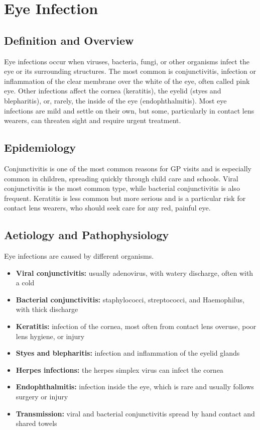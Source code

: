 \chapter{Eye Infection}

\section*{Definition and Overview}
Eye infections occur when viruses, bacteria, fungi, or other organisms infect the eye or its surrounding structures. The most common is conjunctivitis, infection or inflammation of the clear membrane over the white of the eye, often called pink eye. Other infections affect the cornea (keratitis), the eyelid (styes and blepharitis), or, rarely, the inside of the eye (endophthalmitis). Most eye infections are mild and settle on their own, but some, particularly in contact lens wearers, can threaten sight and require urgent treatment.

\section*{Epidemiology}
Conjunctivitis is one of the most common reasons for GP visits and is especially common in children, spreading quickly through child care and schools. Viral conjunctivitis is the most common type, while bacterial conjunctivitis is also frequent. Keratitis is less common but more serious and is a particular risk for contact lens wearers, who should seek care for any red, painful eye.

\section*{Aetiology and Pathophysiology}
Eye infections are caused by different organisms.
\begin{itemize}
    \item \textbf{Viral conjunctivitis:} usually adenovirus, with watery discharge, often with a cold
    \item \textbf{Bacterial conjunctivitis:} staphylococci, streptococci, and Haemophilus, with thick discharge
    \item \textbf{Keratitis:} infection of the cornea, most often from contact lens overuse, poor lens hygiene, or injury
    \item \textbf{Styes and blepharitis:} infection and inflammation of the eyelid glands
    \item \textbf{Herpes infections:} the herpes simplex virus can infect the cornea
    \item \textbf{Endophthalmitis:} infection inside the eye, which is rare and usually follows surgery or injury
    \item \textbf{Transmission:} viral and bacterial conjunctivitis spread by hand contact and shared towels
\end{itemize}

